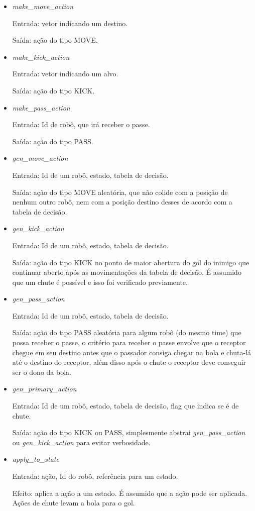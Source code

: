 \begin{itemize}
  \item \textit{make_move_action}
    \par Entrada: vetor indicando um destino.
    \par Saída: ação do tipo MOVE.
  \item \textit{make_kick_action}
    \par Entrada: vetor indicando um alvo.
    \par Saída: ação do tipo KICK.
  \item \textit{make_pass_action}
    \par Entrada: Id de robô, que irá receber o passe.
    \par Saída: ação do tipo PASS.
  \item \textit{gen_move_action}
    \par Entrada: Id de um robô, estado, tabela de decisão.
    \par Saída: ação do tipo MOVE aleatória, que não colide com a posição de
    nenhum outro robô, nem com a posição destino desses de acordo com a tabela
    de decisão.
  \item \textit{gen_kick_action}
    \par Entrada: Id de um robô, estado, tabela de decisão.
    \par Saída: ação do tipo KICK no ponto de maior abertura do gol do inimigo
    que continuar aberto após as movimentações da tabela de decisão.  É assumido
    que um chute é possível e isso foi verificado previamente.
  \item \textit{gen_pass_action}
    \par Entrada: Id de um robô, estado, tabela de decisão.
    \par Saída: ação do tipo PASS aleatória para algum robô (do mesmo time) que
    possa receber o passe, o critério para receber o passe envolve que o
    receptor chegue em seu destino antes que o passador consiga chegar na bola e
    chuta-lá até o destino do receptor, além disso após o chute o receptor deve
    conseguir ser o dono da bola.
  \item \textit{gen_primary_action}
    \par Entrada: Id de um robô, estado, tabela de decisão, flag que indica se é
    de chute.
    \par Saída: ação do tipo KICK ou PASS, simplesmente abstrai
    \textit{gen_pass_action} ou \textit{gen_kick_action} para evitar verbosidade.
  \item \textit{apply_to_state}
    \par Entrada: ação, Id do robô, referência para um estado.
    \par Efeito: aplica a ação a um estado.  É assumido que a ação pode ser
    aplicada.  Ações de chute levam a bola para o gol.
\end{itemize}

